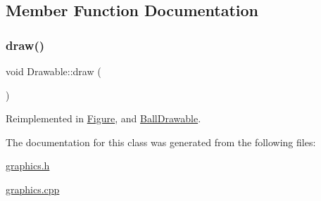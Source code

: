 \subsection{Member Function Documentation}
\mbox{\label{classDrawable_a1231e00fe6022c2ff0e8d61fd23c5c23}} 
\subsubsection{\texorpdfstring{draw()}{draw()}}
{\footnotesize\ttfamily void Drawable\+::draw (\begin{DoxyParamCaption}{ }\end{DoxyParamCaption})\hspace{0.3cm}{\ttfamily [virtual]}}



Reimplemented in \hyperlink{classFigure_afb62fad838fc6f7ece4f88b318b5862a}{Figure}, and \hyperlink{classBallDrawable_ae7cf6aaf513598338f14fc5c04bb7aed}{Ball\+Drawable}.



The documentation for this class was generated from the following files\+:\begin{DoxyCompactItemize}
\item 
\hyperlink{graphics_8h}{graphics.\+h}\item 
\hyperlink{graphics_8cpp}{graphics.\+cpp}\end{DoxyCompactItemize}
